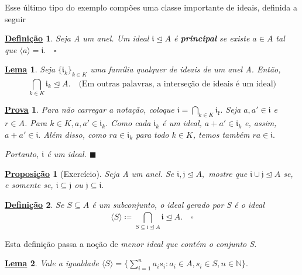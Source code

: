 \documentclass{article}
\newtheorem*{def*}{\underline{Defini\c c\~ao}}
\newtheorem*{lemma*}{\underline{Lema}}
\newtheorem*{prop*}{\underline{Proposi\c c\~ao}}
\newtheorem*{proof*}{\underline{Prova}}
\renewcommand\qedsymbol{$\blacksquare$}
\begin{document}
Esse último tipo do exemplo compões uma classe importante de ideais, definida a seguir
\begin{def*}
  Seja A um anel. Um ideal \(\mathfrak{i}\trianglelefteq{A}\) é \textbf{principal} se existe \(a\in A\) tal que \(\langle a \rangle = \mathfrak{i}.\quad\square\)
\end{def*}
\begin{lemma*}
  Seja \(\{\mathfrak{i}_{k}\}_{k\in K}\) uma família qualquer de ideais de um anel A. Então, 
  \[
    \bigcap_{k\in K}^{}{\mathfrak{i}_{k}}\trianglelefteq{A}.\quad \text{(Em outras palavras, a interseção de ideais é um ideal)}
  \]
\end{lemma*}
\begin{proof*}
  Para não carregar a notação, coloque \(\mathfrak{i} = \bigcap_{k\in K}^{}{\mathfrak{i_{k}}}.\) Seja \(a, a'\in \mathfrak{i}\) e \(r\in A\).
  Para \(k\in K, a, a'\in \mathfrak{i}_{k}\). Como cada \(\mathfrak{i}_{k}\) é um ideal, \(a + a'\in \mathfrak{i}_{k}\) e, assim,
  \(a + a'\in \mathfrak{i}.\) Além disso, como \(ra\in \mathfrak{i}_{k}\) para todo \(k\in K\), temos também \(ra \in \mathfrak{i}.\)

  Portanto, \(\mathfrak{i}\) é um ideal. \qedsymbol
\end{proof*}
\begin{prop*}[Exercício]
  Seja A um anel. Se \(\mathfrak{i}, \mathfrak{j}\trianglelefteq{A},\) mostre que \(\mathfrak{i}\cup \mathfrak{j}\trianglelefteq{A}\) se, e somente se,
  \(\mathfrak{i}\subseteq{\mathfrak{j}}\) ou \(\mathfrak{j}\subseteq{\mathfrak{i}}.\)
\end{prop*}
\begin{def*}
  Se \(S\subseteq{A}\) é um subconjunto, o ideal gerado por S é o ideal 
  \[
    \langle S \rangle\coloneqq \bigcap_{S\subseteq{\mathfrak{i}}\trianglelefteq{A}}^{}{\mathfrak{i}} \trianglelefteq{A}.\quad\square
  \]
\end{def*}
Esta definição passa a noção de \textit{menor ideal que contém o conjunto S.}
\begin{lemma*}
  Vale a igualdade \(\langle S \rangle = \{\sum\limits_{i=1}^{n}a_{i}s_{i}: a_{i}\in A, s_{i}\in S, n\in \mathbb{N}\}.\)
\end{lemma*}
\end{document}
